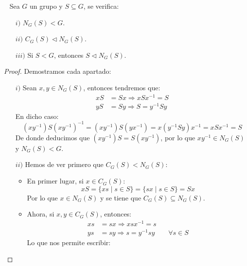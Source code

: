 \begin{prop}~\label{prop:normalizador} %
    Sea $G$ un grupo y $S\subseteq G$, se verifica:
    \begin{enumerate}
        \item[$i)$] $N_G(S) < G$.
        \item[$ii)$] $C_G(S) \lhd N_G(S)$.
        \item[$iii)$] Si $S<G$, entonces $S\lhd N_G(S)$.
    \end{enumerate}
    \begin{proof}
        Demostramos cada apartado:
        \begin{enumerate}
            \item[$i)$] Sean $x,y\in N_G(S)$, entonces tendremos que:
                \begin{align*}
                    xS &= Sx \Longrightarrow xSx^{-1} = S \\
                    yS &= Sy \Longrightarrow S = y^{-1}Sy
                \end{align*}
                En dicho caso:
                \begin{equation*}
                    (xy^{-1})S{(xy^{-1})}^{-1} = (xy^{-1})S(yx^{-1}) = x(y^{-1}Sy)x^{-1} = xSx^{-1} = S
                \end{equation*}
                De donde deducimos que $(xy^{-1})S = S(xy^{-1})$, por lo que $xy^{-1}\in N_G(S)$ y $N_G(S) < G$.
            \item[$ii)$] Hemos de ver primero que $C_G(S) < N_G(S)$:
                \begin{itemize}
                    \item En primer lugar, si $x\in C_G(S)$:
                        \begin{equation*}
                            xS = \{xs \mid s\in S\} = \{sx \mid s\in S\} = Sx
                        \end{equation*}
                        Por lo que $x\in N_G(S)$ y se tiene que $C_G(S) \subseteq N_G(S)$.
                    \item Ahora, si $x,y\in C_G(S)$, entonces:
                        \begin{align*}
                            xs &= sx \Longrightarrow xsx^{-1} = s \\
                            ys &= sy \Longrightarrow s = y^{-1}sy \qquad \forall s\in S
                        \end{align*}
                        Lo que nos permite escribir:

\end{itemize}
\end{enumerate}
\end{proof}
\end{prop}
